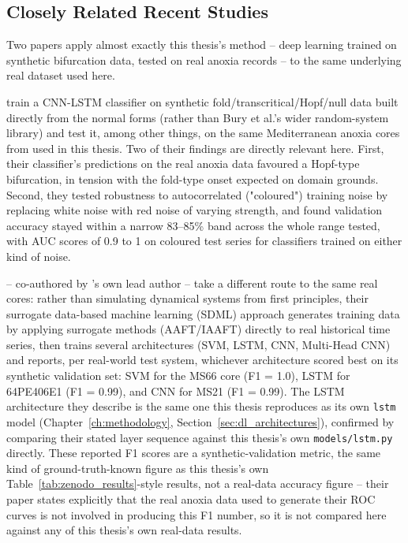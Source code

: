 \subsection{Closely Related Recent Studies}
Two papers apply almost exactly this thesis's method -- deep learning trained on synthetic bifurcation data, tested on real anoxia records -- to the same underlying real dataset used here.

\citet{babazadeh2025} train a CNN-LSTM classifier on synthetic fold/transcritical/Hopf/null data built directly from the normal forms (rather than Bury et al.'s wider random-system library) and test it, among other things, on the same Mediterranean anoxia cores from \citet{hennekam2020} used in this thesis. Two of their findings are directly relevant here. First, their classifier's predictions on the real anoxia data favoured a Hopf-type bifurcation, in tension with the fold-type onset expected on domain grounds. Second, they tested robustness to autocorrelated ("coloured") training noise by replacing white noise with red noise of varying strength, and found validation accuracy stayed within a narrow 83--85\% band across the whole range tested, with AUC scores of 0.9 to 1 on coloured test series for classifiers trained on either kind of noise.

\citet{ma2025sdml} -- co-authored by \citet{bury2021}'s own lead author -- take a different route to the same real cores: rather than simulating dynamical systems from first principles, their surrogate data-based machine learning (SDML) approach generates training data by applying surrogate methods (AAFT/IAAFT) directly to real historical time series, then trains several architectures (SVM, LSTM, CNN, Multi-Head CNN) and reports, per real-world test system, whichever architecture scored best on its synthetic validation set: SVM for the MS66 core (F1 = 1.0), LSTM for 64PE406E1 (F1 = 0.99), and CNN for MS21 (F1 = 0.99). The LSTM architecture they describe is the same one this thesis reproduces as its own \texttt{lstm} model (Chapter~\ref{ch:methodology}, Section~\ref{sec:dl_architectures}), confirmed by comparing their stated layer sequence against this thesis's own \texttt{models/lstm.py} directly. These reported F1 scores are a synthetic-validation metric, the same kind of ground-truth-known figure as this thesis's own Table~\ref{tab:zenodo_results}-style results, not a real-data accuracy figure -- their paper states explicitly that the real anoxia data used to generate their ROC curves is not involved in producing this F1 number, so it is not compared here against any of this thesis's own real-data results.

